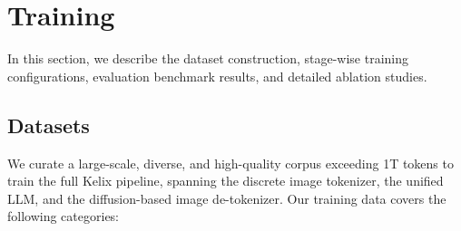 \documentclass[11pt, a4paper, logo, copyright]{googledeepmind}
\begin{document}
\section{Training}

In this section, we describe the dataset construction, stage-wise training configurations, evaluation benchmark results, and detailed ablation studies.



\subsection{Datasets}
We curate a large-scale, diverse, and high-quality corpus exceeding 1T tokens to train the full Kelix pipeline, spanning the discrete image tokenizer, the unified LLM, and the diffusion-based image de-tokenizer. Our training data covers the following categories:
\end{document}
